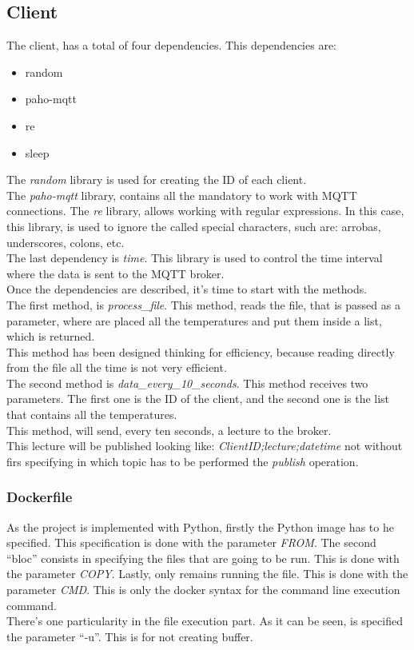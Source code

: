 \documentclass[a4paper,12pt]{article}
\begin{document}
\subsection*{Client}
The client, has a total of four dependencies. This dependencies are:
\begin{itemize}
    \item random
    \item paho-mqtt
    \item re
    \item sleep
\end{itemize}
The \textit{random} library is used for creating the ID of each client.\\
The \textit{paho-mqtt} library, contains all the mandatory to work with MQTT connections.
The \textit{re} library, allows working with regular expressions. In this case, this library, is used to ignore the called special characters, such are: arrobas, underscores, colons, etc.\\
The last dependency is \textit{time}. This library is used to control the time interval where the data is sent to the MQTT broker.\\
Once the dependencies are described, it's time to start with the methods.\\
The first method, is \textit{process\_file}. This method, reads the file, that is passed as a parameter, where are placed all the temperatures and put them inside a list, which is returned.\\
This method has been designed thinking for efficiency, because reading directly from the file all the time is not very efficient.\\
The second method is \textit{data\_every\_10\_seconds}. This method receives two parameters. The first one is the ID of the client, and the second one is the list that contains all the temperatures.\\
This method, will send, every ten seconds, a lecture to the broker.\\
This lecture will be published looking like: \textit{ClientID;lecture;datetime} not without firs specifying in which topic has to be performed the \textit{publish} operation.
\subsubsection*{Dockerfile}
As the project is implemented with Python, firstly the Python image has to he specified. This specification is done with the parameter \textit{FROM}. The second “bloc” consists in specifying the files that are going to be run. This is done with the parameter \textit{COPY}. Lastly, only remains running the file. This is done with the parameter \textit{CMD}. This is only the docker syntax for the command line execution command.\\
There's one particularity in the file execution part. As it can be seen, is specified the parameter “-u”. This is for not creating buffer.
\end{document}

